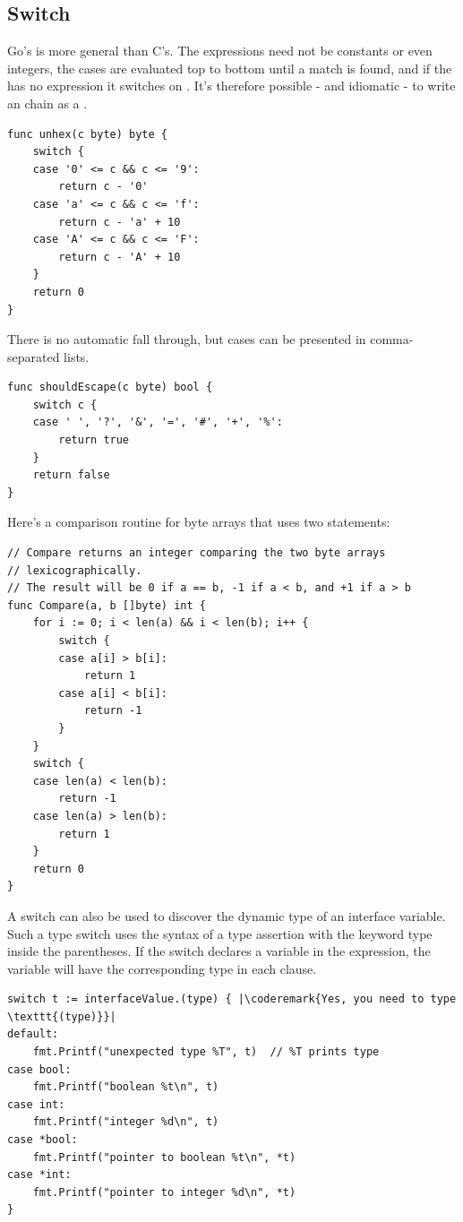 \subsection{Switch}
Go's  is more general than C's. The expressions need not be
constants or even integers, the cases are evaluated top to bottom until
a match is found, and if the  has no expression it switches on
. It's therefore possible - and idiomatic - to write an
chain as a .
\begin{lstlisting}
func unhex(c byte) byte {
    switch {
    case '0' <= c && c <= '9':
        return c - '0'
    case 'a' <= c && c <= 'f':
        return c - 'a' + 10
    case 'A' <= c && c <= 'F':
        return c - 'A' + 10
    }
    return 0
}
\end{lstlisting}
There is no automatic fall through, but cases can be presented in comma-separated lists.

\begin{lstlisting}
func shouldEscape(c byte) bool {
    switch c {
    case ' ', '?', '&', '=', '#', '+', '%':
        return true
    }
    return false
}
\end{lstlisting}
Here's a comparison routine for byte arrays that uses two  statements:

\begin{lstlisting}
// Compare returns an integer comparing the two byte arrays
// lexicographically.
// The result will be 0 if a == b, -1 if a < b, and +1 if a > b
func Compare(a, b []byte) int {
    for i := 0; i < len(a) && i < len(b); i++ {
        switch {
        case a[i] > b[i]:
            return 1
        case a[i] < b[i]:
            return -1
        }
    }
    switch {
    case len(a) < len(b):
        return -1
    case len(a) > len(b):
        return 1
    }
    return 0
}
\end{lstlisting}
A switch can also be used to discover the dynamic type of an interface
variable. Such a type switch uses 
the syntax of a type assertion with the keyword type inside the
parentheses. If the switch declares a variable in the expression, the
variable will have the corresponding type in each clause.

\begin{lstlisting}
switch t := interfaceValue.(type) { |\coderemark{Yes, you need to type \texttt{(type)}}|
default:
    fmt.Printf("unexpected type %T", t)  // %T prints type
case bool:
    fmt.Printf("boolean %t\n", t)
case int:
    fmt.Printf("integer %d\n", t)
case *bool:
    fmt.Printf("pointer to boolean %t\n", *t)
case *int:
    fmt.Printf("pointer to integer %d\n", *t)
}
\end{lstlisting}

